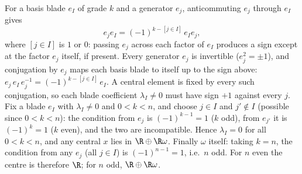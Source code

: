 For a basis blade $e_I$ of grade $k$ and a generator $e_j$, anticommuting $e_j$ through $e_I$ gives
\[
e_j e_I = (-1)^{k - [j \in I]}\, e_I e_j,
\]
where $[j \in I]$ is $1$ or $0$: passing $e_j$ across each factor of $e_I$ produces a sign except at the factor $e_j$ itself, if present. Every generator $e_j$ is invertible ($e_j^2 = \pm 1$), and conjugation by $e_j$ maps each basis blade to itself up to the sign above: $e_j\, e_I\, e_j^{-1} = (-1)^{k - [j \in I]}\, e_I$. A central element is fixed by every such conjugation, so each blade coefficient $\lambda_I \neq 0$ must have sign $+1$ against every $j$. Fix a blade $e_I$ with $\lambda_I \neq 0$ and $0 < k < n$, and choose $j \in I$ and $j' \notin I$ (possible since $0 < k < n$): the condition from $e_j$ is $(-1)^{k-1} = 1$ ($k$ odd), from $e_{j'}$ it is $(-1)^{k} = 1$ ($k$ even), and the two are incompatible. Hence $\lambda_I = 0$ for all $0 < k < n$, and any central $x$ lies in $\R \oplus \R\omega$. Finally $\omega$ itself: taking $k = n$, the condition from any $e_j$ (all $j \in I$) is $(-1)^{n-1} = 1$, i.e.\ $n$ odd. For $n$ even the centre is therefore $\R$; for $n$ odd, $\R \oplus \R\omega$.
